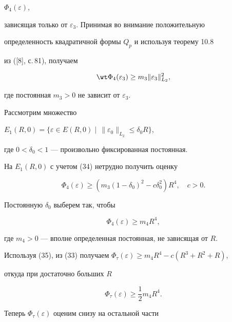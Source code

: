 \begin{pf}
$\Phi_4(\varepsilon)$, 


зависящая только от $\varepsilon_3$. Принимая во внимание положительную 


определенность квадратичной формы $Q_p$ и используя теорему 10.8 


из ([8], с.\,81), получаем 


\begin{equation} 


\wt\Phi_4(\varepsilon_3)\ge m_3\|\varepsilon_3\|^2_{L_2}, 


\end{equation} 


где постоянная $m_3>0$ не зависит от $\varepsilon_3$. 


 


Рассмотрим множество 


$E_1(R,0)=\{\varepsilon\in E(R,0)\mid\, 


\|\varepsilon_0\|_{L_2}\le\delta_0R\}$, 


где $0<\delta_0<1$ --- произвольно фиксированная постоянная. 


На $E_1(R,0)$ с учетом (34) нетрудно получить оценку 


$$ 


\Phi_4(\varepsilon)\ge(m_3(1-\delta_0)^2- 


c\delta^2_0)R^4,\quad c>0. 


$$ 


Постоянную $\delta_0$ выберем так, чтобы 


\begin{equation} 


\Phi_4(\varepsilon)\ge m_4R^4, 


\end{equation} 


где $m_4>0$ --- вполне определенная постоянная, не зависящая от $R$. 


Используя (35), из (33) получаем $\Phi_\tau(\varepsilon)\ge 


m_4R^4-c(R^3+R^2+R)$, 


откуда при достаточно больших $R$ 


\begin{equation} 


\Phi_\tau(\varepsilon)\ge\frac{1}{2}m_4R^4. 


\end{equation} 


Теперь $\Phi_\tau(\varepsilon)$ оценим снизу на остальной части 



\end{pf}
